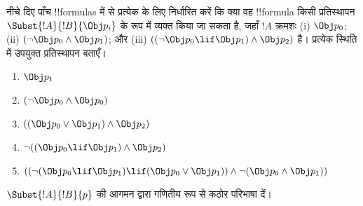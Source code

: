 \documentclass[../../../include/open-logic-section]{subfiles}
\begin{document}
\begin{prob} नीचे दिए पाँच !!{formula}s में से प्रत्येक के लिए निर्धारित करें
कि क्या वह !!{formula} किसी प्रतिस्थापन \( \Subst{!A}{!B}{\Obj p_i} \) के रूप
में व्यक्त किया जा सकता है, जहाँ \( !A \) क्रमशः (i) \( \Obj p_0 \);
(ii) \( ( \lnot \Obj p_0 \land \Obj
 p_1) \); और (iii) \( ( ( \lnot \Obj p_0 \lif \Obj p_1 ) \land \Obj
 p_2 ) \) है। प्रत्येक
स्थिति में उपयुक्त प्रतिस्थापन बताएँ।
  \begin{enumerate}
    \item \( \Obj p_1 \) 
    \item \( ( \lnot \Obj p_0 \land \Obj p_0 ) \)
    \item \( ( ( \Obj p_0 \lor \Obj p_1 ) \land \Obj p_2 )  \)
    \item \( \lnot ( ( \Obj p_0 \lif \Obj p_1 ) \land \Obj p_2 ) \)
    \item \( (( \lnot ( \Obj p_0 \lif \Obj p_1 ) \lif ( \Obj p_0 \lor \Obj p_1 )) \land \lnot ( \Obj p_0 \land \Obj p_1 )) \)
  \end{enumerate}
\end{prob}

\begin{prob}
$\Subst{!A}{!B}{p}$ की आगमन द्वारा गणितीय रूप से कठोर परिभाषा दें।
\end{prob}
\end{document}
